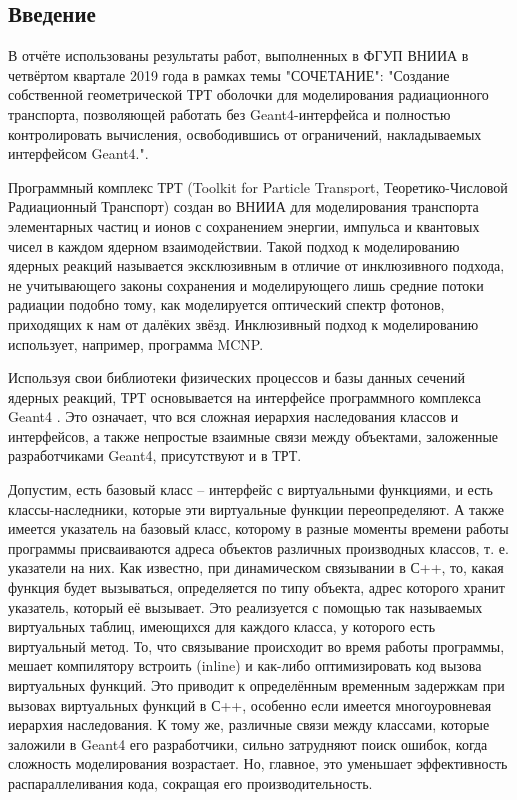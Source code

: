 \documentclass[a4paper,12pt]{article}
\begin{document}
\newpage

\tableofcontents

\begin{large}

\clearpage
\section{Введение}
\label{Intr}
  	В отчёте использованы результаты работ, выполненных в ФГУП ВНИИА в четвёртом квартале 2019 года в рамках темы "СОЧЕТАНИЕ": "Создание собственной геометрической ТРТ оболочки для моделирования радиационного транспорта, позволяющей работать без Geant4-интерфейса и полностью контролировать вычисления, освободившись от ограничений, накладываемых интерфейсом Geant4.".

    Программный комплекс ТРТ (Toolkit for Particle Transport, Теоретико-Числовой Радиационный Транспорт) создан во ВНИИА для моделирования транспорта элементарных частиц и ионов с сохранением энергии, импульса и квантовых чисел в каждом ядерном взаимодействии.
    Такой подход к моделированию ядерных реакций называется эксклюзивным в отличие от инклюзивного подхода, не учитывающего законы сохранения и моделирующего лишь средние потоки радиации подобно тому, как моделируется оптический спектр фотонов, приходящих к нам от далёких звёзд.
    Инклюзивный подход к моделированию использует, например, программа MCNP.
    
    Используя свои библиотеки физических процессов и базы данных сечений ядерных реакций, ТРТ основывается на интерфейсе программного комплекса Geant4 \cite{Geant4.1}.
    Это означает, что вся сложная иерархия наследования классов и интерфейсов, а также непростые взаимные связи между объектами, заложенные разработчиками Geant4, присутствуют и в ТРТ.
    
    Допустим, есть базовый класс -- интерфейс с виртуальными функциями, и есть классы-наследники, которые эти виртуальные функции переопределяют.
    А также имеется указатель на базовый класс, которому в разные моменты времени работы программы присваиваются адреса объектов различных производных классов, т. е. указатели на них.
    Как известно, при динамическом связывании в С++, то, какая функция будет вызываться, определяется по типу объекта, адрес которого хранит указатель, который её вызывает.
    Это реализуется с помощью так называемых виртуальных таблиц, имеющихся для каждого класса, у которого есть виртуальный метод.
    То, что связывание происходит во время работы программы, мешает компилятору встроить (inline) и  как-либо оптимизировать код вызова виртуальных функций.
    Это приводит к определённым временным задержкам при вызовах виртуальных функций в С++, особенно если имеется многоуровневая иерархия наследования.
    К тому же, различные связи между классами, которые заложили в Geant4 его разработчики, сильно затрудняют поиск ошибок, когда сложность моделирования возрастает.
    Но, главное, это уменьшает эффективность распараллеливания кода, сокращая его производительность.
    

\end{large}
\end{document}
